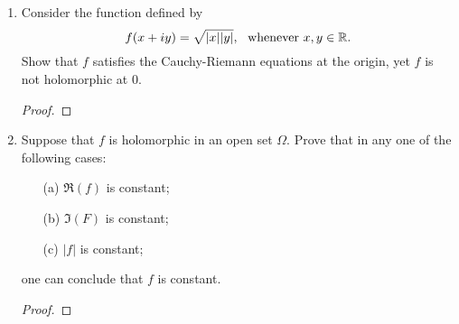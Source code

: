 \documentclass[11pt,a4paper]{book}
\begin{document}
\begin{enumerate}
\begin{proof}
        To show that the real and imaginary parts of \( f  \) are \textbf{harmonic}, we need to show that
        \[  \Delta u  =  \frac{\partial ^{2} u }{\partial  x^{2} }  + \frac{\partial ^{2} u }{\partial y^{2} }  = 0 \]
        and
        \[ \Delta v = \frac{\partial ^{2} v }{\partial x^{2} }  + \frac{\partial ^{2} v  }{\partial y^{2} } = 0   \]
        where \( u  \) and \( v  \) are the real and imaginary parts of \( f  \), respectively.
        Since \( f  \) is holomorphic in the open set \( \Omega  \), then the Cauchy-Riemann equations must hold; that is, 
        \[  \frac{\partial u }{\partial x }  = \frac{\partial v }{\partial y } \ \ \text{and} \ \ \frac{\partial u }{\partial y } = - \frac{\partial v }{\partial x }.   \]
        Thus, using Clairaut's Theorem we can see that
        \begin{align*}
            \Delta u  =  \frac{\partial ^{2} u }{\partial  x^{2} }  + \frac{\partial ^{2} u }{\partial y^{2} }  
                      &= \frac{\partial  }{\partial x  }  \Big(  \frac{\partial u }{\partial x }  \Big) + \frac{\partial  }{\partial y }  \Big(  \frac{\partial u }{\partial y }  \Big) \\ 
                      &= \frac{\partial  }{\partial x  }  \Big(  \frac{\partial v }{\partial y }  \Big) + \frac{\partial  }{\partial y }  \Big(  -\frac{\partial v }{\partial x }  \Big) \\ 
                      &= \frac{\partial v^{2} }{ \partial x \partial y } - \frac{\partial  v^{2}  }{\partial y \partial x   } \\
                      &= 0.
        \end{align*}
        By a similar argument, we have that
            \[ \Delta v = \frac{\partial ^{2} v }{\partial x^{2} }  + \frac{\partial ^{2} v  }{\partial y^{2} } = - \frac{\partial ^{2} u  }{\partial x \partial y  }  + \frac{\partial ^{2} u  }{\partial y \partial x  }   = 0.   \]
        Thus, the real and imaginary parts of \( f  \) are harmonic.  
        \end{proof}
    \item Consider the function defined by
        \[  f(x + iy) = \sqrt{ | x  |  | y |  }, \ \ \text{whenever } x,y \in \mathbb{R}.   \]
    Show that \( f  \) satisfies the Cauchy-Riemann equations at the origin, yet \( f  \) is not holomorphic at \( 0 \).
    \begin{proof}
    
    \end{proof}
    \item Suppose that \( f  \) is holomorphic in an open set \( \Omega  \). Prove that in any one of the following cases:
        \begin{enumerate}
            \item[(a)] \( \Re(f) \) is constant;
            \item[(b)] \( \Im(F) \) is constant;
            \item[(c)] \( | f |  \) is constant;
        \end{enumerate}
        one can conclude that \( f  \) is constant.
        \begin{proof}
        

\end{proof}
\end{enumerate}
\end{document}
